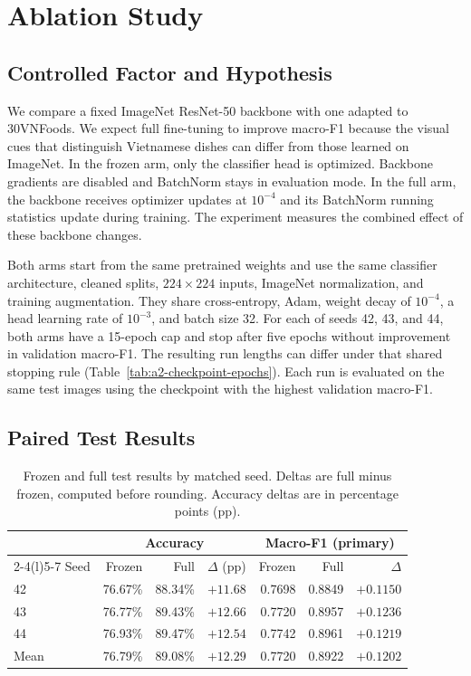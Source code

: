 \section{Ablation Study}
\label{sec:ablation}

\subsection{Controlled Factor and Hypothesis}

We compare a fixed ImageNet ResNet-50 backbone with one adapted to 30VNFoods. We expect full fine-tuning to improve macro-F1 because the visual cues that distinguish Vietnamese dishes can differ from those learned on ImageNet. In the frozen arm, only the classifier head is optimized. Backbone gradients are disabled and BatchNorm stays in evaluation mode. In the full arm, the backbone receives optimizer updates at $10^{-4}$ and its BatchNorm running statistics update during training. The experiment measures the combined effect of these backbone changes.

Both arms start from the same pretrained weights and use the same classifier architecture, cleaned splits, $224\times224$ inputs, ImageNet normalization, and training augmentation. They share cross-entropy, Adam, weight decay of $10^{-4}$, a head learning rate of $10^{-3}$, and batch size 32. For each of seeds 42, 43, and 44, both arms have a 15-epoch cap and stop after five epochs without improvement in validation macro-F1. The resulting run lengths can differ under that shared stopping rule (Table~\ref{tab:a2-checkpoint-epochs}). Each run is evaluated on the same test images using the checkpoint with the highest validation macro-F1.

\subsection{Paired Test Results}

\begin{table}[H]
  \centering
  \small
  \caption{Frozen and full test results by matched seed. Deltas are full minus frozen, computed before rounding. Accuracy deltas are in percentage points (pp).}
  \label{tab:a2-ablation-paired}
  \begin{tabular}{@{}lrrrrrr@{}}
    \toprule
    & \multicolumn{3}{c}{Accuracy} & \multicolumn{3}{c}{Macro-F1 (primary)} \\
    \cmidrule(lr){2-4}\cmidrule(l){5-7}
    Seed & Frozen & Full & $\Delta$ (pp) & Frozen & Full & $\Delta$ \\
    \midrule
    42 & 76.67\% & 88.34\% & $+11.68$ & 0.7698 & 0.8849 & $+0.1150$ \\
    43 & 76.77\% & 89.43\% & $+12.66$ & 0.7720 & 0.8957 & $+0.1236$ \\
    44 & 76.93\% & 89.47\% & $+12.54$ & 0.7742 & 0.8961 & $+0.1219$ \\
    \midrule
    Mean & 76.79\% & 89.08\% & $+12.29$ & 0.7720 & 0.8922 & $+0.1202$ \\
    \bottomrule
  \end{tabular}
\end{table}

